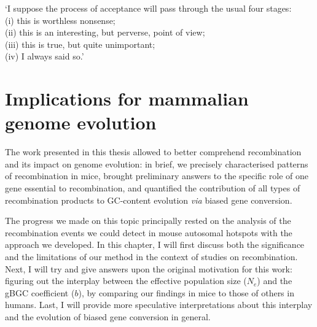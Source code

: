 \begin{savequote}[8cm]

	‘I suppose the process of acceptance will pass through the usual four stages:\\
	(i) this is worthless nonsense;\\
	(ii) this is an interesting, but perverse, point of view;\\
	(iii) this is true, but quite unimportant;\\
	(iv) I always said so.’
	
	
\end{savequote}

\chapter{\label{ch:9-discussion}Implications for mammalian genome evolution}


\minitoc{}


The work presented in this thesis allowed to better comprehend recombination and its impact on genome evolution: 
in brief, we precisely characterised patterns of recombination in mice, brought preliminary answers to the specific role of one gene essential to recombination, and quantified the contribution of all types of recombination products to GC-content evolution \textit{via} biased gene conversion.

The progress we made on this topic principally rested on the analysis of the recombination events we could detect in mouse autosomal hotspots with the approach we developed. 
In this chapter, I will first discuss both the significance and the limitations of our method in the context of studies on recombination.
Next, I will try and give answers upon the original motivation for this work: figuring out the interplay between the effective population size ($N_e$) and the gBGC coefficient ($b$), by comparing our findings in mice to those of others in humans.
Last, I will provide more speculative interpretations about this interplay and the evolution of biased gene conversion in general.


